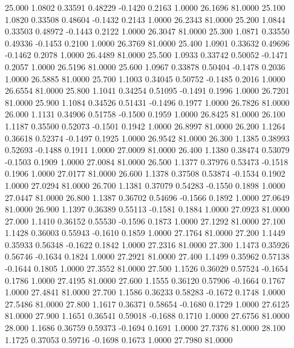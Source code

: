   25.000   1.0802   0.33591   0.48229  -0.1420   0.2163   1.0000  26.1696  81.0000
  25.100   1.0820   0.33508   0.48604  -0.1432   0.2143   1.0000  26.2343  81.0000
  25.200   1.0844   0.33503   0.48972  -0.1443   0.2122   1.0000  26.3047  81.0000
  25.300   1.0871   0.33550   0.49336  -0.1453   0.2100   1.0000  26.3769  81.0000
  25.400   1.0901   0.33632   0.49696  -0.1462   0.2078   1.0000  26.4489  81.0000
  25.500   1.0933   0.33742   0.50052  -0.1471   0.2057   1.0000  26.5196  81.0000
  25.600   1.0967   0.33878   0.50404  -0.1478   0.2036   1.0000  26.5885  81.0000
  25.700   1.1003   0.34045   0.50752  -0.1485   0.2016   1.0000  26.6554  81.0000
  25.800   1.1041   0.34254   0.51095  -0.1491   0.1996   1.0000  26.7201  81.0000
  25.900   1.1084   0.34526   0.51431  -0.1496   0.1977   1.0000  26.7826  81.0000
  26.000   1.1131   0.34906   0.51758  -0.1500   0.1959   1.0000  26.8425  81.0000
  26.100   1.1187   0.35500   0.52073  -0.1501   0.1942   1.0000  26.8997  81.0000
  26.200   1.1264   0.36618   0.52374  -0.1497   0.1925   1.0000  26.9542  81.0000
  26.300   1.1385   0.38993   0.52693  -0.1488   0.1911   1.0000  27.0009  81.0000
  26.400   1.1380   0.38474   0.53079  -0.1503   0.1909   1.0000  27.0084  81.0000
  26.500   1.1377   0.37976   0.53473  -0.1518   0.1906   1.0000  27.0177  81.0000
  26.600   1.1378   0.37508   0.53874  -0.1534   0.1902   1.0000  27.0294  81.0000
  26.700   1.1381   0.37079   0.54283  -0.1550   0.1898   1.0000  27.0447  81.0000
  26.800   1.1387   0.36702   0.54696  -0.1566   0.1892   1.0000  27.0649  81.0000
  26.900   1.1397   0.36389   0.55113  -0.1581   0.1884   1.0000  27.0923  81.0000
  27.000   1.1410   0.36152   0.55530  -0.1596   0.1873   1.0000  27.1292  81.0000
  27.100   1.1428   0.36003   0.55943  -0.1610   0.1859   1.0000  27.1764  81.0000
  27.200   1.1449   0.35933   0.56348  -0.1622   0.1842   1.0000  27.2316  81.0000
  27.300   1.1473   0.35926   0.56746  -0.1634   0.1824   1.0000  27.2921  81.0000
  27.400   1.1499   0.35962   0.57138  -0.1644   0.1805   1.0000  27.3552  81.0000
  27.500   1.1526   0.36029   0.57524  -0.1654   0.1786   1.0000  27.4195  81.0000
  27.600   1.1555   0.36120   0.57906  -0.1664   0.1767   1.0000  27.4841  81.0000
  27.700   1.1586   0.36233   0.58283  -0.1672   0.1748   1.0000  27.5486  81.0000
  27.800   1.1617   0.36371   0.58654  -0.1680   0.1729   1.0000  27.6125  81.0000
  27.900   1.1651   0.36541   0.59018  -0.1688   0.1710   1.0000  27.6756  81.0000
  28.000   1.1686   0.36759   0.59373  -0.1694   0.1691   1.0000  27.7376  81.0000
  28.100   1.1725   0.37053   0.59716  -0.1698   0.1673   1.0000  27.7980  81.0000
